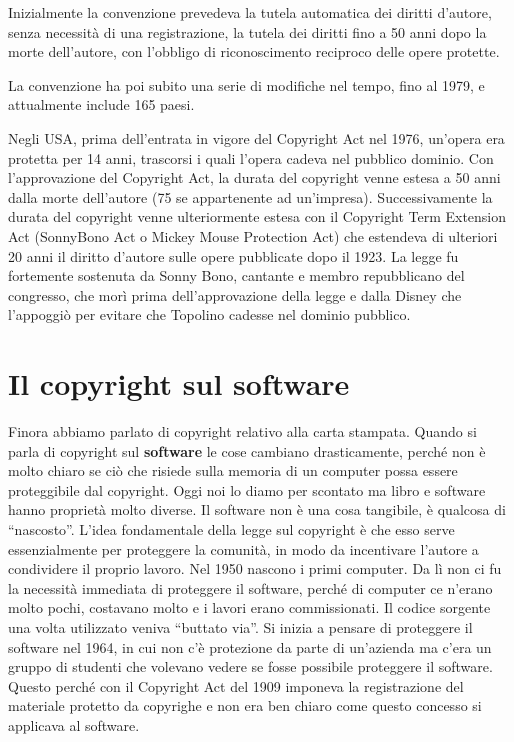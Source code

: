 Inizialmente la convenzione prevedeva la tutela automatica dei diritti d'autore, senza necessità di una registrazione, la tutela dei diritti fino a 50 anni dopo la morte dell'autore, con l'obbligo di riconoscimento reciproco delle opere protette.

La convenzione ha poi subito una serie di modifiche nel tempo, fino al 1979, e attualmente include 165 paesi. 

Negli USA, prima dell'entrata in vigore del Copyright Act nel 1976, un'opera era protetta per 14 anni, trascorsi i quali l'opera cadeva nel pubblico dominio. Con l'approvazione del Copyright Act, la durata del copyright venne estesa a 50 anni dalla morte dell'autore (75 se appartenente ad un'impresa). Successivamente la durata del copyright venne ulteriormente estesa con il Copyright Term Extension Act (SonnyBono Act o Mickey Mouse Protection Act) che estendeva di ulteriori 20 anni il diritto d'autore sulle opere pubblicate dopo il 1923. La legge fu fortemente sostenuta da Sonny Bono, cantante e membro repubblicano del congresso, che morì prima dell'approvazione della legge e dalla Disney che l'appoggiò per evitare che Topolino cadesse nel dominio pubblico.

\section{Il copyright sul software}

Finora abbiamo parlato di copyright relativo alla carta stampata. Quando si parla di copyright sul \textbf{software} le cose cambiano drasticamente, perché non è molto chiaro se ciò che risiede sulla memoria di un computer possa essere proteggibile dal copyright. Oggi noi lo diamo per scontato ma libro e software hanno proprietà molto diverse. Il software non è una cosa tangibile, è qualcosa di ``nascosto''. L'idea fondamentale della legge sul copyright è che esso serve essenzialmente per proteggere la comunità, in modo da incentivare l'autore a condividere il proprio lavoro. Nel 1950 nascono i primi computer. Da lì non ci fu la necessità immediata di proteggere il software, perché di computer ce n'erano molto pochi, costavano molto e i lavori erano commissionati. Il codice sorgente una volta utilizzato veniva ``buttato via''. Si inizia a pensare di proteggere il software nel 1964, in cui non c'è protezione da parte di un'azienda ma c'era un gruppo di studenti che volevano vedere se fosse possibile proteggere il software. Questo perché con il Copyright Act del 1909 imponeva la registrazione del materiale protetto da copyrighe e non era ben chiaro come questo concesso si applicava al software.

